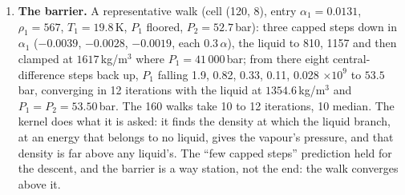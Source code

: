 \documentclass[11pt,a4paper]{article}
\newcommand{\code}[1]{\texttt{\small #1}}
\begin{document}
\begin{enumerate}[nosep]
      entry, at the kernel's first evaluation (one iteration):
      \code{eos\_fail(liq,vap)} $= 740, 0$.  The prediction of the vapour
      leaving its branch is \textbf{refuted}; the kernel never takes a
      step on these cells.  And a correction to follow-ups 18 to 20: the
      383 band liquids that follow-up 18's test refused and the records
      called supercritical were these root-less traces (the test
      refused on a failed solve as well as on $T \ge T_c$); the count of
      band liquids with a root above $T_c$ on the same run is zero.
      Nothing supercritical was ever in the liquid slot on XC2D.
\item \textbf{The barrier.}  A representative walk (cell (120, 8),
      entry $\alpha_1 = 0.0131$, $\rho_1 = 567$, $T_1 = 19.8$\,K, $P_1$
      floored, $P_2 = 52.7$\,bar): three capped steps down in $\alpha_1$
      ($-0.0039$, $-0.0028$, $-0.0019$, each $0.3\,\alpha$), the liquid
      to 810, 1157 and then clamped at $1617$\,kg/m$^3$ where
      $P_1 = 41\,000$\,bar; from there eight central-difference steps back
      up, $P_1$ falling 1.9, 0.82, 0.33, 0.11, 0.028 $\times 10^{9}$ to
      $53.5$\,bar, converging in 12 iterations with the liquid at
      $1354.6$\,kg/m$^3$ and $P_1 = P_2 = 53.50$\,bar.  The 160 walks take
      10 to 12 iterations, 10 median.  The kernel does what it is asked:
      it finds the density at which the liquid branch, at an energy that
      belongs to no liquid, gives the vapour's pressure, and that density
      is far above any liquid's.  The ``few capped steps'' prediction
      held for the descent, and the barrier is a way station, not the
      end: the walk converges above it.
\end{enumerate}
\end{document}
